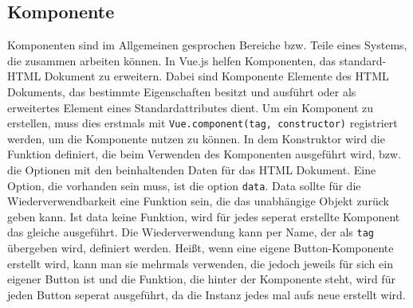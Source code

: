 \subsection*{Komponente}
Komponenten sind im Allgemeinen gesprochen Bereiche bzw. Teile eines Systems, die zusammen arbeiten k\"onnen.
In Vue.js helfen Komponenten, das standard-\ac{HTML} Dokument zu erweitern. Dabei sind Komponente Elemente des \ac{HTML} Dokuments, das bestimmte Eigenschaften besitzt und ausf\"uhrt oder als erweitertes Element eines Standardattributes dient. Um ein Komponent zu erstellen, muss dies erstmals mit \texttt{Vue.component(tag, constructor)} registriert werden, um die Komponente nutzen zu k\"onnen\cite{VueDokumentationComponents2018}. In dem Konstruktor wird die Funktion definiert, die beim Verwenden des Komponenten ausgef\"uhrt wird, bzw. die Optionen mit den beinhaltenden Daten f\"ur das \ac{HTML} Dokument. Eine Option, die vorhanden sein muss, ist die option \texttt{data}. Data sollte f\"ur die Wiederverwendbarkeit eine Funktion sein, die das unabh\"angige Objekt zur\"uck geben kann. Ist data keine Funktion, wird f\"ur jedes seperat erstellte Komponent das gleiche ausgef\"uhrt. Die Wiederverwendung kann per Name, der als \texttt{tag} \"ubergeben wird, definiert werden. Hei\ss{}t, wenn eine eigene Button-Komponente erstellt wird, kann man sie mehrmals verwenden, die jedoch jeweils f\"ur sich ein eigener Button ist und die Funktion, die hinter der Komponente steht, wird f\"ur jeden Button seperat ausgef\"uhrt, da die Instanz jedes mal aufs neue erstellt wird\cite{VueDokumentationComponents2018}.
